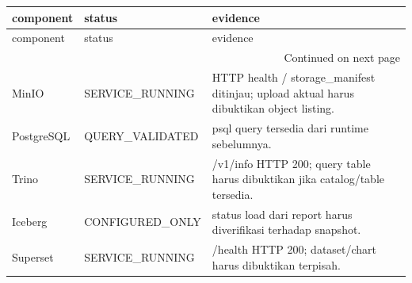 \begingroup
\scriptsize
\begin{longtable}{lll}
\toprule
component & status & evidence \\
\midrule
\endfirsthead
\toprule
component & status & evidence \\
\midrule
\endhead
\midrule
\multicolumn{3}{r}{Continued on next page} \\
\midrule
\endfoot
\bottomrule
\endlastfoot
MinIO & SERVICE\_RUNNING & HTTP health / storage\_manifest ditinjau; upload aktual harus dibuktikan object listing. \\
PostgreSQL & QUERY\_VALIDATED & psql query tersedia dari runtime sebelumnya. \\
Trino & SERVICE\_RUNNING & /v1/info HTTP 200; query table harus dibuktikan jika catalog/table tersedia. \\
Iceberg & CONFIGURED\_ONLY & status load dari report harus diverifikasi terhadap snapshot. \\
Superset & SERVICE\_RUNNING & /health HTTP 200; dataset/chart harus dibuktikan terpisah. \\
\end{longtable}
\endgroup
